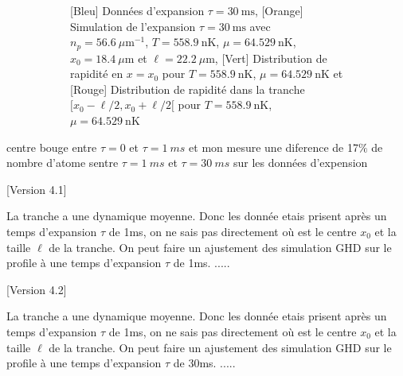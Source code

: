 \documentclass[a3, 10pt,twoside]{article}          %
\theoremstyle{plain}
\theoremstyle{definition}
\theoremstyle{remark}
\theoremstyle{definition} %
\begin{document}
\begin{figure}[H]
\begin{subfigure}[b]{0.45\textwidth}
        \caption{{\color{blue}[Bleu] Données d'expansion $\tau = 30~\text{ms}$}, {\color{orange}[Orange] Simulation de l'expansion $\tau = 30~\text{ms}$ avec $n_p = 56.6~\mu \text{m}^{-1}$, $T = 558.9~\text{nK}$, $\mu = 64.529~\text{nK}$, $x_0 = 18.4~\mu \text{m}$ et $\ell = 22.2~\mu \text{m}$}, {\color{OliveGreen}[Vert] Distribution de rapidité en $x = x_0$ pour $T = 558.9~\text{nK}$, $\mu = 64.529~\text{nK}$} et {\color{red}[Rouge] Distribution de rapidité dans la tranche $[x_0 - \ell/2, x_0 + \ell/2[$ pour $T = 558.9~\text{nK}$, $\mu = 64.529~\text{nK}$}}
        \label{fig:expansion_30_22}
    \end{subfigure}
    \caption{}
    \label{}
\end{figure}

	 
	
	
	{\color{blue} centre bouge entre $\tau = 0$ et $\tau = 1~ms$ et mon mesure une diference de 17$\%$ de nombre d'atome sentre $\tau = 1~ms$ et $\tau = 30 ~ms$ sur les données d'expension}
	
	
	[Version 4.1]
	
	La tranche a une dynamique moyenne. Donc  les donnée etais prisent après un temps d'expansion $\tau$ de 1ms, on ne sais pas directement où est le centre  $x_0$ et la taille $\ell$ de la tranche.
	On peut faire un ajustement des simulation GHD sur le profile à une temps d'expansion $\tau$ de 1ms. .....
	
	[Version 4.2]	
	
	La tranche a une dynamique moyenne. Donc  les donnée etais prisent après un temps d'expansion $\tau$ de 1ms, on ne sais pas directement où est le centre  $x_0$ et la taille $\ell$ de la tranche.
	On peut faire un ajustement des simulation GHD sur le profile à une temps d'expansion $\tau$ de 30ms. .....
	
\end{document}
